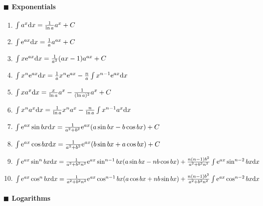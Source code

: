 \paragraph{$\blacksquare$ Exponentials}

\begin{enumerate}

\item $ \int a^x \mathrm{d} x= \frac{1}{\ln a} a^x + C$

\item $ \int \mathrm{e} ^{ax}\mathrm{d} x=\frac{1}{a}a^{ax}+C $

\item $ \int x \mathrm{e}  ^ {ax} \mathrm{d} x=\frac{1}{a^2}(ax-1)a^{ax} +C $

\item $ \int x^n \mathrm{e} ^{ax} \mathrm{d} x=\frac{1}{a}x^n \mathrm{e} ^{ax}-\frac{n}{a} \int x^{n-1} \mathrm{e} ^ {ax} \mathrm{d} x $

\item $ \int x a^x \mathrm{d} x = \frac{x}{\ln a}a^x-\frac{1}{(\ln a)^2}a^x+C $

\item $ \int x^n a^x \mathrm{d} x= \frac{1}{\ln a}x^n a^x-\frac{n}{\ln a}\int x^{n-1}a^x \mathrm{d} x $

\item $ \int \mathrm{e} ^{ax} \sin bx \mathrm{d} x = \frac{1}{a^2+b^2}\mathrm{e} ^{ax}(a \sin bx - b \cos bx)+C $

\item $ \int \mathrm{e} ^{ax} \cos bx \mathrm{d} x = \frac{1}{a^2+b^2}\mathrm{e} ^{ax}(b \sin bx + a \cos bx)+C $

\item $ \int \mathrm{e} ^{ax} \sin ^ n bx \mathrm{d} x=\frac{1}{a^2+b^2 n^2}\mathrm{e} ^{ax} \sin ^ {n-1} bx (a \sin bx -nb \cos bx) +\frac{n(n-1)b^2}{a^2+b^2 n^2}\int \mathrm{e} ^{ax} \sin ^{n-2} bx \mathrm{d} x $

\item $ \int \mathrm{e} ^{ax} \cos ^ n bx \mathrm{d} x=\frac{1}{a^2+b^2 n^2}\mathrm{e} ^{ax} \cos ^ {n-1} bx (a \cos bx +nb \sin bx) +\frac{n(n-1)b^2}{a^2+b^2 n^2}\int \mathrm{e} ^{ax} \cos ^{n-2} bx \mathrm{d} x $

\end{enumerate}

\paragraph{$\blacksquare$ Logarithms}

